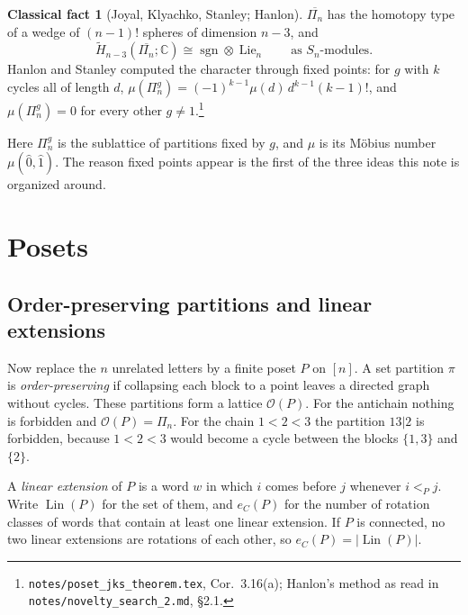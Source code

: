 \documentclass[11pt]{article}
\theoremstyle{definition}
\newtheorem{fact}{Classical fact}
\theoremstyle{remark}
\newcommand{\OP}{\mathcal O}
\newcommand{\Lin}{\operatorname{Lin}}
\newcommand{\Lie}{\operatorname{Lie}}
\newcommand{\sgn}{\operatorname{sgn}}
\newcommand{\src}[1]{\nolinkurl{#1}}
\newcommand{\tagbox}[1]{\leavevmode\marginpar{\raggedright\fbox{\parbox{0.66in}{\centering\scriptsize\sffamily #1}}}}
\newcommand{\CITED}{\tagbox{CLASSICAL\\(CITED)}}
\begin{document}
\begin{fact}[Joyal, Klyachko, Stanley; Hanlon]\CITED
$\overline{\Pi_n}$ has the homotopy type of a wedge of $(n-1)!$ spheres of
dimension $n-3$, and
\[
\widetilde H_{n-3}(\overline{\Pi_n};\mathbb C)\cong\sgn\otimes\Lie_n
\qquad\text{as $S_n$-modules.}
\]
Hanlon and Stanley computed the character through fixed points: for $g$ with
$k$ cycles all of length $d$,
$\mu(\Pi_n^g)=(-1)^{k-1}\mu(d)\,d^{k-1}(k-1)!$, and $\mu(\Pi_n^g)=0$ for every
other $g\ne1$.\footnote{\src{notes/poset_jks_theorem.tex}, Cor.~3.16(a);
Hanlon's method as read in \src{notes/novelty_search_2.md}, \S2.1.}
\end{fact}

Here $\Pi_n^g$ is the sublattice of partitions fixed by $g$, and $\mu$ is its
M\"obius number $\mu(\hat0,\hat1)$. The reason fixed points appear is the
first of the three ideas this note is organized around.

\medskip
\noindent{}

\section{Posets}

\subsection{Order-preserving partitions and linear extensions}

Now replace the $n$ unrelated letters by a finite poset $P$ on $[n]$. A set
partition $\pi$ is \emph{order-preserving} if collapsing each block to a point
leaves a directed graph without cycles. These partitions form a lattice
$\OP(P)$. For the antichain nothing is forbidden and $\OP(P)=\Pi_n$. For the
chain $1<2<3$ the partition $13|2$ is forbidden, because $1<2<3$ would become
a cycle between the blocks $\{1,3\}$ and $\{2\}$.

A \emph{linear extension} of $P$ is a word $w$ in which $i$ comes before $j$
whenever $i<_Pj$. Write $\Lin(P)$ for the set of them, and $e_C(P)$ for the
number of rotation classes of words that contain at least one linear
extension. If $P$ is connected, no two linear extensions are rotations of
each other, so $e_C(P)=|\Lin(P)|$.
\end{document}
